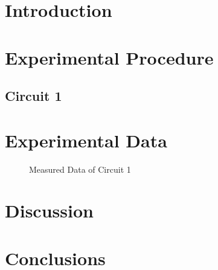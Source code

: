 \documentclass[12pt,legalpaper]{article}
\begin{document}

\section*{Introduction}
\section*{Experimental Procedure}
\subsection*{Circuit 1}
\begin{figure}[H]
    \centering
    
\end{figure}

\section*{Experimental Data}
\begin{figure}[H]
    \label{table 1}
    \centering
    \vspace{0.3em}
    
    \caption{Measured Data of Circuit 1}
\end{figure}

\section*{Discussion}

\section*{Conclusions}
\end{document}
